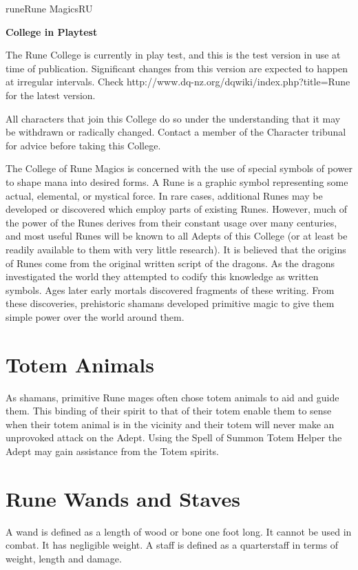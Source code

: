 \begin{College}[2.2]{rune}{Rune Magics}{RU}

\textbf{College in Playtest}

The Rune College is currently in play test, and this is the test
version in use at time of publication.  Significant changes from this
version are expected to happen at irregular intervals. Check
http://www.dq-nz.org/dqwiki/index.php?title=Rune for the latest
version.

All characters that join this College do so under the understanding
that it may be withdrawn or radically changed.  Contact a member of
the Character tribunal for advice before taking this College.

The College of Rune Magics is concerned with the use of special
symbols of power to shape mana into desired forms.  A Rune is a
graphic symbol representing some actual, elemental, or mystical force.
In rare cases, additional Runes may be developed or discovered which
employ parts of existing Runes. However, much of the power of the
Runes derives from their constant usage over many centuries, and most
useful Runes will be known to all Adepts of this College (or at least
be readily available to them with very little research). It is
believed that the origins of Runes come from the original written
script of the dragons. As the dragons investigated the world they
attempted to codify this knowledge as written symbols.  Ages later
early mortals discovered fragments of these writing.  From these
discoveries, prehistoric shamans developed primitive magic to give
them simple power over the world around them.


\section{Totem Animals}

As shamans, primitive Rune mages often chose totem animals to aid and
guide them. This binding of their spirit to that of their totem enable
them to sense when their totem animal is in the vicinity and their
totem will never make an unprovoked attack on the Adept.  Using the
Spell of Summon Totem Helper the Adept may gain assistance from the
Totem spirits.


\section{Rune Wands and Staves}

A wand is defined as a length of wood or bone one foot long. It cannot
be used in combat. It has negligible weight.  A staff is defined as a
quarterstaff in terms of weight, length and damage.


\end{College}
